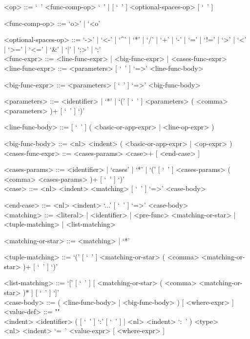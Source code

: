 \documentclass{article}
\begin{document}
\begin{grammar}
<op> ::= `\ ' <func-comp-op> `\ ' | [ `\ ' ] <optional-spaces-op> [ `\ ' ]

<func-comp-op> ::= `o>' | `<o'

<optional-spaces-op> ::= 
`->' | `<-' | `^' | `*' | `/' | `+' | `-' | `=' | `!=' | `>' | `<' | `>=' |
`<=' | `\&' | `|' | `;>' | `;'
\\

\newpage
<func-expr> ::= <line-func-expr> | <big-func-expr> | <cases-func-expr>
\\

<line-func-expr> ::= <parameters> [ `\ ' ] `=>' <line-func-body>

<big-func-expr> ::= <parameters> [ `\ ' ] `=>' <big-func-body>

<parameters> ::=
<identifier> | `*' |
`(' [ `\ ' ] <parameters> ( <comma> <parameters> )+ [ `\ ' ] `)'

<line-func-body> ::= [ `\ ' ] ( <basic-or-app-expr> | <line-op-expr> )

<big-func-body> ::= <nl> <indent> ( <basic-or-app-expr> | <op-expr> )
\\

<cases-func-expr> ::= <cases-params> <case>+ [ <end-case> ]

<cases-params> ::=
<identifier> | `cases' | `*' |
`(' [ `\ ' ] <cases-params> ( <comma> <cases-params> )+ [ `\ ' ] `)'
\\

<case> ::=  <nl> <indent> <matching> [ `\ ' ] `=>' <case-body>

<end-case> ::= <nl> <indent> `...' [ `\ ' ] `=>' <case-body>
\\

<matching> ::= 
<literal> | <identifier> | <pre-func> <matching-or-star> | <tuple-matching> |
<list-matching>

<matching-or-star> ::= <matching> | `*'

<tuple-matching> ::=
`(' [ `\ ' ] <matching-or-star> ( <comma> <matching-or-star> )+ [ `\ ' ] `)'

<list-matching> ::=
`[' [ `\ ' ] [ <matching-or-star> ( <comma> <matching-or-star> )* ] [ `\ ' ]
`]'
\\

<case-body> ::= ( <line-func-body> | <big-func-body> ) [ <where-expr> ]
\\

<value-def> ::= ""\\
<indent> <identifier> 
( [ `\ ' ] `:' [ `\ ' ] | <nl> <indent> `:\ ' ) <type>  \\
<nl> <indent> `=\ ' <value-expr> [ <where-expr> ]


\end{grammar}
\end{document}
